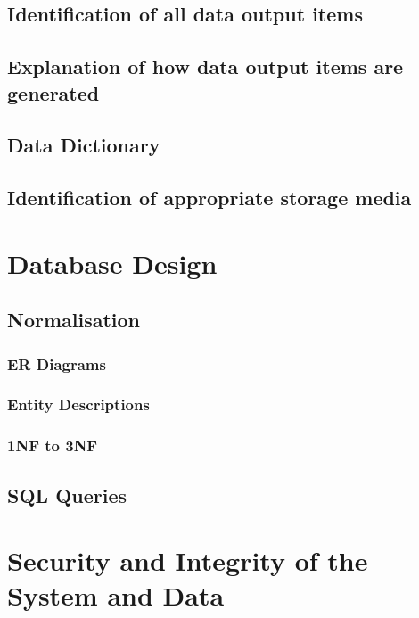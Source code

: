 \subsection{Identification of all data output items}

\subsection{Explanation of how data output items are generated}

\subsection{Data Dictionary}

\subsection{Identification of appropriate storage media}

\section{Database Design}

\subsection{Normalisation}

\subsubsection{ER Diagrams}

\subsubsection{Entity Descriptions}

\subsubsection{1NF to 3NF}

\subsection{SQL Queries}

\section{Security and Integrity of the System and Data}


